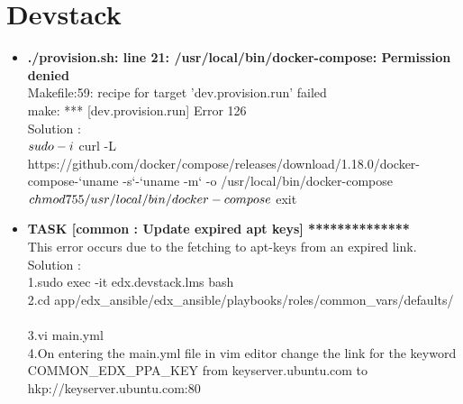 \documentclass[11pt]{report}
\begin{document}
	\section{Devstack}
	\large
	\begin{itemize}
		\item \textbf{./provision.sh: line 21: /usr/local/bin/docker-compose: Permission denied} \ \\
		Makefile:59: recipe for target 'dev.provision.run' failed \ \\
		make: *** [dev.provision.run] Error 126 \ \\
		Solution : \ \\
		$ sudo -i  \ \\
		$ curl -L \ \\ https://github.com/docker/compose/releases/download/1.18.0/docker-compose-`uname -s`-`uname -m` -o /usr/local/bin/docker-compose \ \\
		$ chmod 755 /usr/local/bin/docker-compose \ \\
		$ exit \ \\
		
		\item \textbf{TASK [common : Update expired apt keys] **************} \ \\
		This error occurs due to the fetching to apt-keys from an expired link. \ \\
		Solution : \ \\
		1.sudo exec -it edx.devstack.lms bash \ \\
		2.cd app/edx\_ansible/edx\_ansible/playbooks/roles/common\_vars/defaults/ \ \\
		3.vi main.yml \ \\
		4.On entering the main.yml file in vim editor change the link for the keyword
		COMMON\_EDX\_PPA\_KEY from keyserver.ubuntu.com to  hkp://keyserver.ubuntu.com:80 \ \\
	\end{itemize}
	
\end{document}
